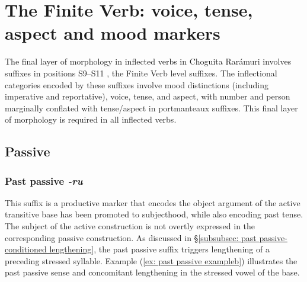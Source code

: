 \section{The Finite Verb: voice, tense, aspect and mood markers}
\label{sec: the finite verb}

The final layer of morphology in inflected verbs in Choguita Rarámuri involves suffixes in positions S9--S11 , the Finite Verb level suffixes. The inflectional categories encoded by these suffixes involve mood distinctions (including imperative and reportative), voice, tense, and aspect, with number and person marginally conflated with tense/aspect in portmanteaux suffixes. This final layer of morphology is required in all inflected verbs.

\subsection{Passive}
\label{subsec: passive}
\largerpage
\subsubsection{Past passive \textit{-ru}}
\label{subsubsec: past passive}

This suffix is a productive marker that encodes the object argument of the active transitive base has been promoted to subjecthood, while also encoding past tense. The subject of the active construction is not overtly expressed in the corresponding passive construction. As discussed in §\ref{subsubsec: past passive-conditioned lengthening}, the past passive suffix triggers lengthening of a preceding stressed syllable. Example (\ref{ex: past passive exampleb}) illustrates the past passive sense and concomitant lengthening in the stressed vowel of the base.

\ea\label{ex: past passive example}

    \label{ex: past passive examplea}
        \label{ex: past passive exampleb}
    \z
\z


